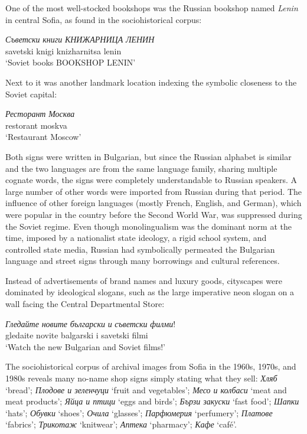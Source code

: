 \documentclass[output=paper]{langscibook}
\begin{document}
One of the most well-stocked bookshops was the Russian bookshop named \textit{Lenin} in central Sofia, as found in the sociohistorical corpus:

\begin{exe}
  \ex\label{slavova:ex:1}
  \gll \textit{Съветски} \textit{книги} \textit{КНИЖАРНИЦА} \textit{ЛЕНИН} \\
  savetski knigi knizharnitsa lenin \\
  \glt ‘Soviet books BOOKSHOP LENIN’
\end{exe}

\noindent
Next to it was another landmark location indexing the symbolic closeness to the Soviet capital:

\begin{exe}
  \ex\label{slavova:ex:2}
  \gll \textit{Ресторант} \textit{Москва} \\
  restorant moskva \\
  \glt ‘Restaurant Moscow’
\end{exe}

\noindent
Both signs were written in Bulgarian, but since the Russian alphabet is similar and the two languages are from the same language family, sharing multiple cognate words, the signs were completely understandable to Russian speakers. A large number of other words were imported from Russian during that period. The influence of other foreign languages (mostly French, English, and German), which were popular in the country before the Second World War, was suppressed during the Soviet regime. Even though monolingualism was the dominant norm at the time, imposed by a nationalist state ideology, a rigid school system, and controlled state media, Russian had symbolically permeated the Bulgarian language and street signs through many borrowings and cultural references.

Instead of advertisements of brand names and luxury goods, cityscapes were dominated by ideological slogans, such as the large imperative neon slogan on a wall facing the Central Departmental Store:

\begin{exe}
  \ex\label{slavova:ex:3}
  \gll \textit{Гледайте} \textit{новите} \textit{български} \textit{и} 
  \textit{съветски} \textit{филми}! \\
  gledaite novite balgarski i savetski filmi \\
  \glt ‘Watch the new Bulgarian and Soviet films!’
\end{exe}


The sociohistorical corpus of archival images from Sofia in the 1960s, 1970s, and 1980s reveals many no-name shop signs simply stating what they sell: \textit{Хляб} ‘bread’; \textit{Плодове и зеленчуци} ‘fruit and vegetables’; \textit{Месо и колбаси} ‘meat and meat products’; \textit{Яйца и птици} ‘eggs and birds’; \textit{Бързи закуски} ‘fast food’; \textit{Шапки} ‘hats’; \textit{Обувки} ‘shoes’; \textit{Очила} ‘glasses’; \textit{Парфюмерия} ‘perfumery’; \textit{Платове} ‘fabrics’; \textit{Трикотаж} ‘knitwear’; \textit{Аптека} ‘pharmacy’; \textit{Кафе} ‘café’. 
\end{document}
